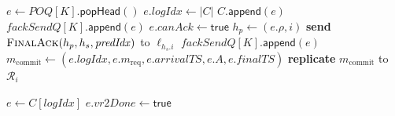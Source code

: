 \begin{algorithm}[!tb]
\begin{algorithmic}[1]
          \State $e\gets\mathit{POQ}[K].\mathsf{popHead}()$
          \State $e.\mathit{logIdx}\gets |C|$
          \State $C.\mathsf{append}(e)$
            \State $fackSendQ[K].\mathsf{append}(e)$
          \Else
            \State $e.\mathit{canAck}\gets\mathsf{true}$
            \State $h_p\gets(e.\rho,i)$
                \State \textbf{send} $\textsc{FinalAck}(h_p, h_s, \mathit{predIdx})$
                to $\ell_{h_s.i}$
            \EndFor
                \State $fackSendQ[K].\mathsf{append}(e)$
            \EndIf
          \EndIf
          \State $m_{\mathrm{commit}}\gets
            (e.\mathit{logIdx},
             e.m_{\mathrm{req}},
             e.\mathit{arrivalTS},
             e.A,
             e.\mathit{finalTS})$
          \State \textbf{replicate} $m_{\mathrm{commit}}$
            to $\mathcal{R}_i$
        \EndWhile
      \EndProcedure
  
        \State $e\gets C[\mathit{logIdx}]$
        \State $e.\mathit{vr2Done}\gets\mathsf{true}$
        \State {}
      \EndProcedure
    \end{algorithmic}
  \end{algorithm}


